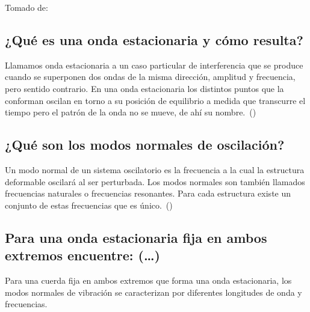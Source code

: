 \documentclass[twocolumn, 12pt]{article}
\begin{document}
Tomado de:~\cite{Fernández}

\subsection{¿Qué es una onda estacionaria y cómo resulta?}

Llamamos onda estacionaria a un caso particular de
interferencia que se produce cuando se superponen dos ondas
de la misma dirección, amplitud y frecuencia, pero sentido
contrario. En una onda estacionaria los distintos puntos
que la conforman oscilan en torno a su posición de
equilibrio a medida que transcurre el tiempo pero el patrón
de la onda no se mueve, de ahí su
nombre.~(\cite{Fernándezb})

\subsection{¿Qué son los modos normales de oscilación?}

Un modo normal de un sistema oscilatorio es la frecuencia a
la cual la estructura deformable oscilará al ser
perturbada. Los modos normales son también llamados
frecuencias naturales o frecuencias resonantes. Para cada
estructura existe un conjunto de estas frecuencias que es
único.~(\cite{modososcilacion})

\subsection{Para una onda estacionaria fija en ambos extremos encuentre: (\dots)}

Para una cuerda fija en ambos extremos que forma una onda
estacionaria, los modos normales de vibración se
caracterizan por diferentes longitudes de onda y
frecuencias.
\end{document}
